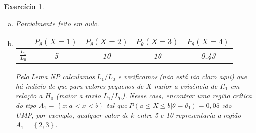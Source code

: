 \documentclass[letter,11pt]{article}
\newtheorem{exer}{Exercício}
\begin{document}
\begin{exer} \rm
\begin{enumerate}[a)] 
  \item %
  Parcialmente feito em aula.
  \item %

\begin{center}
\begin{tabular}{c|cccc}
& $P_\theta(X=1)$ & $P_\theta(X=2)$ & $P_\theta(X=3)$ & $P_\theta(X=4)$ \\
\hline
$\frac{L_1}{L_0}$ & 5 & 10 & 10 & 0.43 \\
\end{tabular}
\end{center}
Pelo Lema NP calculamos $L_1 / L_0$ e verificamos (não está tão claro aqui) que há indício de que para valores pequenos de $X$ maior a evidência de $H_1$ em relação a $H_0$ (maior a razão $L_1/L_0$). Nesse caso, encontrar uma região crítica do tipo $A_1 = \left\{x: a < x < b \right\}$ tal que $P(a \leq X \leq  b \vert \theta = \theta_1) = 0,05$ são UMP, por exemplo, qualquer valor de $k$ entre 5 e 10 representaria a região $A_1 = \left\{2, 3 \right\}$.

\end{enumerate}
\end{exer}
\end{document}
